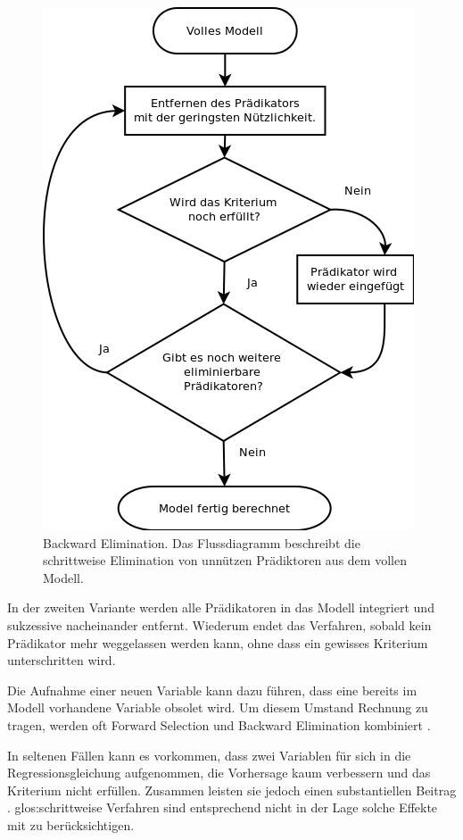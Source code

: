 \begin{figure}[H]
	\centering
	\includegraphics[height=0.5\textheight]{backward_stepwise.png}
	\caption{Backward Elimination. Das Flussdiagramm beschreibt die schrittweise Elimination von unnützen Prädiktoren aus dem vollen Modell.}
	\label{fig:backward_stepwise}
\end{figure}
In der zweiten Variante werden alle Prädikatoren in das Modell integriert und sukzessive nacheinander entfernt. Wiederum endet das Verfahren, sobald kein Prädikator mehr weggelassen werden kann, ohne dass ein gewisses Kriterium unterschritten wird.

Die Aufnahme einer neuen Variable kann dazu führen, dass eine bereits im Modell vorhandene Variable obsolet wird. 
Um diesem Umstand Rechnung zu tragen, werden oft Forward Selection und Backward Elimination kombiniert \cite[p. 461]{bortz2011}. 

In seltenen Fällen kann es vorkommen, dass zwei Variablen für sich in die Regressionsgleichung aufgenommen, die Vorhersage kaum verbessern und das Kriterium nicht erfüllen. Zusammen leisten sie jedoch  einen substantiellen Beitrag \cite[p.261]{jacob2003applied}. 
\Gls{glos:schrittweise Verfahren} sind entsprechend nicht in der Lage solche Effekte mit zu berücksichtigen. 

